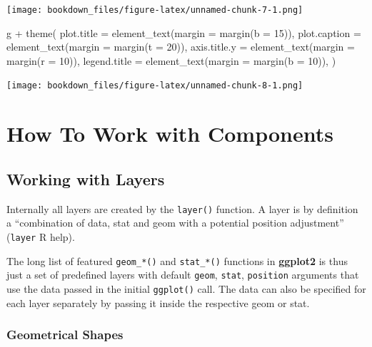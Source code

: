 \documentclass[
]{krantz}
\makeatletter
\newenvironment{Shaded}{\begin{snugshade}}{\end{snugshade}}
\newcommand{\AttributeTok}[1]{\textcolor[rgb]{0.61,0.61,0.61}{#1}}
\newcommand{\DecValTok}[1]{\textcolor[rgb]{0.06,0.06,0.06}{#1}}
\newcommand{\FunctionTok}[1]{\textcolor[rgb]{0,0,0}{#1}}
\newcommand{\NormalTok}[1]{#1}
\newcommand{\SpecialCharTok}[1]{\textcolor[rgb]{0,0,0}{#1}}
\newenvironment{kframe}{%
\medskip{}
\setlength{\fboxsep}{.8em}
 \def\at@end@of@kframe{}%
 \ifinner\ifhmode%
  \def\at@end@of@kframe{\end{minipage}}%
  \begin{minipage}{\columnwidth}%
 \fi\fi%
 \def\FrameCommand##1{\hskip\@totalleftmargin \hskip-\fboxsep
 \colorbox{shadecolor}{##1}\hskip-\fboxsep
     \hskip-\linewidth \hskip-\@totalleftmargin \hskip\columnwidth}%
 \MakeFramed {\advance\hsize-\width
   \@totalleftmargin\z@ \linewidth\hsize
   \@setminipage}}%
 {\par\unskip\endMakeFramed%
 \at@end@of@kframe}
\renewenvironment{Shaded}{\begin{kframe}}{\end{kframe}}
\makeatother
\begin{document}
\texttt{[image: bookdown\_files/figure-latex/unnamed-chunk-7-1.png]}

\begin{Shaded}
\begin{Highlighting}[]
\NormalTok{g }\SpecialCharTok{+} \FunctionTok{theme}\NormalTok{(}
  \AttributeTok{plot.title =} \FunctionTok{element\_text}\NormalTok{(}\AttributeTok{margin =} \FunctionTok{margin}\NormalTok{(}\AttributeTok{b =} \DecValTok{15}\NormalTok{)),}
  \AttributeTok{plot.caption =} \FunctionTok{element\_text}\NormalTok{(}\AttributeTok{margin =} \FunctionTok{margin}\NormalTok{(}\AttributeTok{t =} \DecValTok{20}\NormalTok{)),}
  \AttributeTok{axis.title.y =} \FunctionTok{element\_text}\NormalTok{(}\AttributeTok{margin =} \FunctionTok{margin}\NormalTok{(}\AttributeTok{r =} \DecValTok{10}\NormalTok{)),}
  \AttributeTok{legend.title =} \FunctionTok{element\_text}\NormalTok{(}\AttributeTok{margin =} \FunctionTok{margin}\NormalTok{(}\AttributeTok{b =} \DecValTok{10}\NormalTok{)),}
\NormalTok{)}
\end{Highlighting}
\end{Shaded}

\texttt{[image: bookdown\_files/figure-latex/unnamed-chunk-8-1.png]}

\hypertarget{part-how-to-work-with-components}{%
\part{How To Work with Components}\label{part-how-to-work-with-components}}

\hypertarget{working-with-layers}{%
\chapter{Working with Layers}\label{working-with-layers}}

Internally all layers are created by the \texttt{layer()} function. A layer is by definition a ``combination of data, stat and geom with a potential position adjustment'' (\texttt{layer} R help).

The long list of featured \texttt{geom\_*()} and \texttt{stat\_*()} functions in \textbf{ggplot2} is thus just a set of predefined layers with default \texttt{geom}, \texttt{stat}, \texttt{position} arguments that use the data passed in the initial \texttt{ggplot()} call. The data can also be specified for each layer separately by passing it inside the respective geom or stat.

\hypertarget{geometrical-shapes}{%
\section{Geometrical Shapes}\label{geometrical-shapes}}
\end{document}
